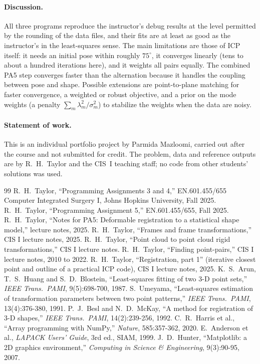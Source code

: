 \documentclass[10pt]{article}
\begin{document}
\paragraph{Discussion.} All three programs reproduce the instructor's debug results at the level permitted by the rounding of the data files, and their fits are at least as good as the instructor's in the least-squares sense. The main limitations are those of ICP itself: it needs an initial pose within roughly $75^\circ$, it converges linearly (tens to about a hundred iterations here), and it weights all pairs equally. The combined PA5 step converges faster than the alternation because it handles the coupling between pose and shape. Possible extensions are point-to-plane matching for faster convergence, a weighted or robust objective, and a prior on the mode weights (a penalty $\sum_m\lambda_m^2/\sigma_m^2$) to stabilize the weights when the data are noisy.

\paragraph{Statement of work.} This is an individual portfolio project by Parmida Mazloomi, carried out after the course and not submitted for credit. The problem, data and reference outputs are by R.~H.~Taylor and the CIS~I teaching staff; no code from other students' solutions was used.

\begin{thebibliography}{99}\small
{} R.~H.~Taylor, ``Programming Assignments 3 and 4,'' EN.601.455/655 Computer Integrated Surgery I, Johns Hopkins University, Fall 2025.
 R.~H.~Taylor, ``Programming Assignment 5,'' EN.601.455/655, Fall 2025.
 R.~H.~Taylor, ``Notes for PA5: Deformable registration to a statistical shape model,'' lecture notes, 2025.
 R.~H.~Taylor, ``Frames and frame transformations,'' CIS I lecture notes, 2025.
 R.~H.~Taylor, ``Point cloud to point cloud rigid transformations,'' CIS I lecture notes.
 R.~H.~Taylor, ``Finding point-pairs,'' CIS I lecture notes, 2010 to 2022.
 R.~H.~Taylor, ``Registration, part 1'' (iterative closest point and outline of a practical ICP code), CIS I lecture notes, 2025.
 K.~S.~Arun, T.~S.~Huang and S.~D.~Blostein, ``Least-squares fitting of two 3-D point sets,'' \emph{IEEE Trans.\ PAMI}, 9(5):698-700, 1987.
 S.~Umeyama, ``Least-squares estimation of transformation parameters between two point patterns,'' \emph{IEEE Trans.\ PAMI}, 13(4):376-380, 1991.
 P.~J.~Besl and N.~D.~McKay, ``A method for registration of 3-D shapes,'' \emph{IEEE Trans.\ PAMI}, 14(2):239-256, 1992.
 C.~R.~Harris et al., ``Array programming with NumPy,'' \emph{Nature}, 585:357-362, 2020.
 E.~Anderson et al., \emph{LAPACK Users' Guide}, 3rd ed., SIAM, 1999.
 J.~D.~Hunter, ``Matplotlib: a 2D graphics environment,'' \emph{Computing in Science \& Engineering}, 9(3):90-95, 2007.
\end{thebibliography}
\end{document}
